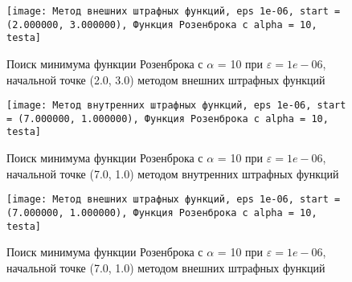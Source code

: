            \begin{figure}[H]
	        \centering
	        \texttt{[image: Метод внешних штрафных функций, eps 1e-06, start = (2.000000, 3.000000), Функция Розенброка с alpha = 10, testa]}%
	        \caption{Поиск минимума функции Розенброка с $\alpha$ = 10 при $\varepsilon = 1e-06$, начальной точке (2.0, 3.0) методом внешних штрафных функций}
	        \vspace*{-1.2cm}
            \end{figure}
            
            \begin{figure}[H]
	        \centering
	        \texttt{[image: Метод внутренних штрафных функций, eps 1e-06, start = (7.000000, 1.000000), Функция Розенброка с alpha = 10, testa]}%
	        \caption{Поиск минимума функции Розенброка с $\alpha$ = 10 при $\varepsilon = 1e-06$, начальной точке (7.0, 1.0) методом внутренних штрафных функций}
	        \vspace*{-1.2cm}
            \end{figure}
            
            \begin{figure}[H]
	        \centering
	        \texttt{[image: Метод внешних штрафных функций, eps 1e-06, start = (7.000000, 1.000000), Функция Розенброка с alpha = 10, testa]}%
	        \caption{Поиск минимума функции Розенброка с $\alpha$ = 10 при $\varepsilon = 1e-06$, начальной точке (7.0, 1.0) методом внешних штрафных функций}
	        \vspace*{-1.2cm}
            \end{figure}
            